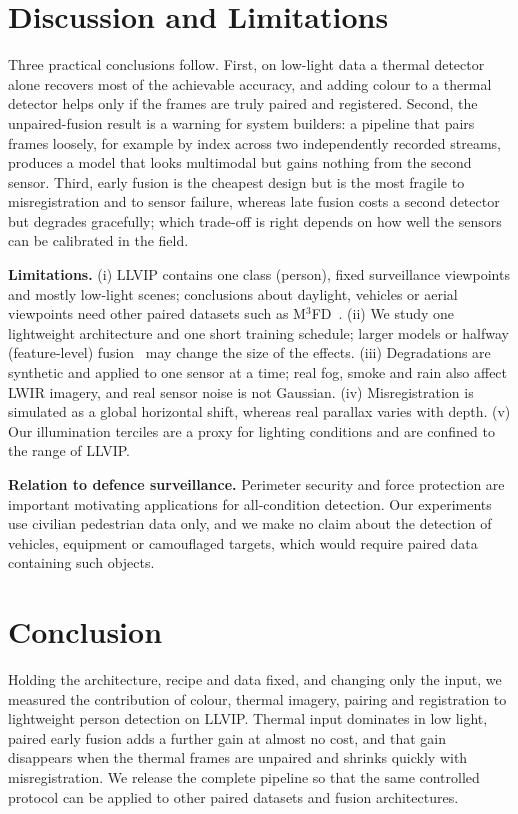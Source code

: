 \documentclass[conference]{IEEEtran}
\newif\ifpending \pendingtrue
\newcommand{\pending}[1]{\ifpending{\color{orange!85!black}#1}\else#1\fi}
\begin{document}
\section{Discussion and Limitations}
\pending{Three practical conclusions follow. First, on low-light data a thermal detector alone recovers most of the achievable accuracy, and adding colour to a thermal detector helps only if the frames are truly paired and registered. Second, the unpaired-fusion result is a warning for system builders: a pipeline that pairs frames loosely, for example by index across two independently recorded streams, produces a model that looks multimodal but gains nothing from the second sensor. Third, early fusion is the cheapest design but is the most fragile to misregistration and to sensor failure, whereas late fusion costs a second detector but degrades gracefully; which trade-off is right depends on how well the sensors can be calibrated in the field.}

\textbf{Limitations.} (i) LLVIP contains one class (person), fixed surveillance viewpoints and mostly low-light scenes; conclusions about daylight, vehicles or aerial viewpoints need other paired datasets such as M$^3$FD~\cite{liu2022tardal}. (ii) We study one lightweight architecture and one short training schedule; larger models or halfway (feature-level) fusion~\cite{liu2016multispectral,zhang2021gaff} may change the size of the effects. (iii) Degradations are synthetic and applied to one sensor at a time; real fog, smoke and rain also affect LWIR imagery, and real sensor noise is not Gaussian. (iv) Misregistration is simulated as a global horizontal shift, whereas real parallax varies with depth. (v) Our illumination terciles are a proxy for lighting conditions and are confined to the range of LLVIP.

\textbf{Relation to defence surveillance.} Perimeter security and force protection are important motivating applications for all-condition detection. Our experiments use civilian pedestrian data only, and we make no claim about the detection of vehicles, equipment or camouflaged targets, which would require paired data containing such objects.

\section{Conclusion}
Holding the architecture, recipe and data fixed, and changing only the input, we measured the contribution of colour, thermal imagery, pairing and registration to lightweight person detection on LLVIP. \pending{Thermal input dominates in low light, paired early fusion adds a further gain at almost no cost, and that gain disappears when the thermal frames are unpaired and shrinks quickly with misregistration.} We release the complete pipeline so that the same controlled protocol can be applied to other paired datasets and fusion architectures.
\end{document}
